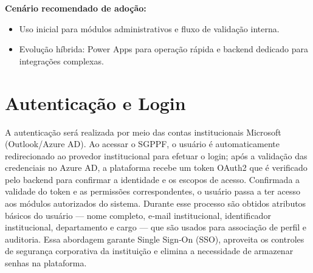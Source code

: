 \documentclass[12pt,a4paper]{article}
\begin{document}
\textbf{Cenário recomendado de adoção:}
\begin{itemize}[leftmargin=*]
  \item Uso inicial para módulos administrativos e fluxo de validação interna.
  \item Evolução híbrida: Power Apps para operação rápida e backend dedicado para integrações complexas.
\end{itemize}

\section{Autenticação e Login}
A autenticação será realizada por meio das contas institucionais Microsoft (Outlook/Azure AD). Ao acessar o SGPPF, o usuário é automaticamente redirecionado ao provedor institucional para efetuar o login; após a validação das credenciais no Azure AD, a plataforma recebe um token OAuth2 que é verificado pelo backend para confirmar a identidade e os escopos de acesso. Confirmada a validade do token e as permissões correspondentes, o usuário passa a ter acesso aos módulos autorizados do sistema. Durante esse processo são obtidos atributos básicos do usuário — nome completo, e‑mail institucional, identificador institucional, departamento e cargo — que são usados para associação de perfil e auditoria. Essa abordagem garante Single Sign‑On (SSO), aproveita os controles de segurança corporativa da instituição e elimina a necessidade de armazenar senhas na plataforma.
\end{document}
